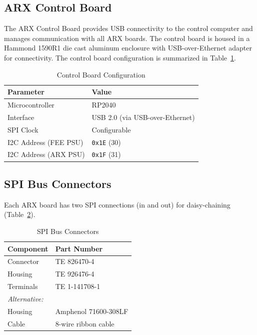 \subsection{ARX Control Board}

The ARX Control Board provides USB connectivity to the control computer and manages communication with all ARX boards. The control board is housed in a Hammond 1590R1 die cast aluminum enclosure with USB-over-Ethernet adapter for connectivity. The control board configuration is summarized in Table~\ref{tab:control-board-config}.

\begin{table}[htbp]
    \centering
    \caption{Control Board Configuration}
    \label{tab:control-board-config}
    \begin{tabular}{ll}
        \toprule
        \textbf{Parameter} & \textbf{Value} \\
        \midrule
        Microcontroller & RP2040 \\
        Interface & USB 2.0 (via USB-over-Ethernet) \\
        SPI Clock & Configurable \\
        I2C Address (FEE PSU) & \texttt{0x1E} (30) \\
        I2C Address (ARX PSU) & \texttt{0x1F} (31) \\
        \bottomrule
    \end{tabular}
\end{table}

\subsection{SPI Bus Connectors}

Each ARX board has two SPI connections (in and out) for daisy-chaining (Table~\ref{tab:spi-connectors}).

\begin{table}[htbp]
    \centering
    \caption{SPI Bus Connectors}
    \label{tab:spi-connectors}
    \begin{tabular}{ll}
        \toprule
        \textbf{Component} & \textbf{Part Number} \\
        \midrule
        Connector & TE 826470-4 \\
        Housing & TE 926476-4 \\
        Terminals & TE 1-141708-1 \\
        \midrule
        \multicolumn{2}{l}{\textit{Alternative:}} \\
        Housing & Amphenol 71600-308LF \\
        Cable & 8-wire ribbon cable \\
        \bottomrule
    \end{tabular}
\end{table}

